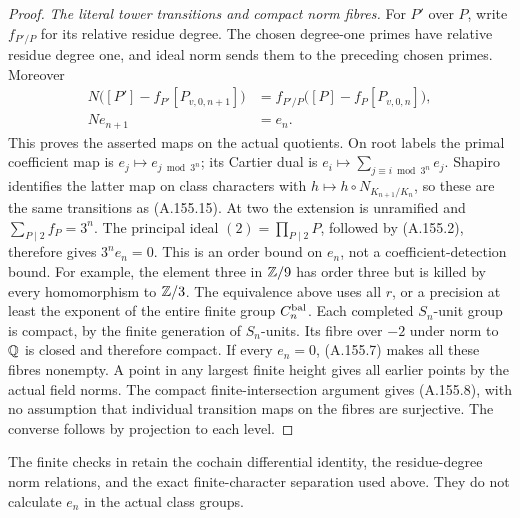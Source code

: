 \begin{proof}
\emph{The literal tower transitions and compact norm fibres.}
For \(P'\) over \(P\), write \(f_{P'/P}\) for its relative
residue degree.  The chosen degree-one primes have relative residue
degree one, and ideal norm sends them to the preceding chosen primes.
Moreover
\[
 \begin{aligned}
 N\bigl([P']-f_{P'}[P_{v,0,n+1}]\bigr)
       &=f_{P'/P}\bigl([P]-f_P[P_{v,0,n}]\bigr),\\
 N e_{n+1}&=e_n.
 \end{aligned}
\tag{A.155.15}
\]
This proves the asserted maps on the actual quotients.
On root labels the primal coefficient map is
\(e_j\mapsto e_{j\bmod3^n}\); its Cartier dual is
\(e_i\mapsto\sum_{j\equiv i\bmod3^n}e_j\).
Shapiro identifies the latter map on class characters with
\(h\mapsto h\circ N_{K_{n+1}/K_n}\), so these are the same
transitions as (A.155.15).
At two the extension is unramified and
\(\sum_{P\mid2}f_P=3^n\).
The principal ideal \((2)=\prod_{P\mid2}P\), followed by
(A.155.2), therefore gives \(3^n e_n=0\).
This is an order bound on \(e_n\), not a coefficient-detection bound.
For example, the element three in \(\mathbb Z/9\) has order three
but is killed by every homomorphism to \(\mathbb Z/3\).
The equivalence above uses all \(r\), or a precision at least
the exponent of the entire finite group \(C_n^{\rm bal}\).
Each completed \(S_n\)-unit group is compact, by the finite
generation of \(S_n\)-units.
Its fibre over \(-2\) under norm to \(\mathbb Q\) is closed and therefore
compact.  If every \(e_n=0\), (A.155.7) makes all these fibres
nonempty.  A point in any largest finite height gives all earlier
points by the actual field norms.  The compact finite-intersection
argument gives (A.155.8), with no assumption that individual
transition maps on the fibres are surjective.
The converse follows by projection to each level.
\end{proof}

The finite checks in
retain the cochain differential identity, the residue-degree norm
relations, and the exact finite-character separation used above.
They do not calculate \(e_n\) in the actual class groups.
